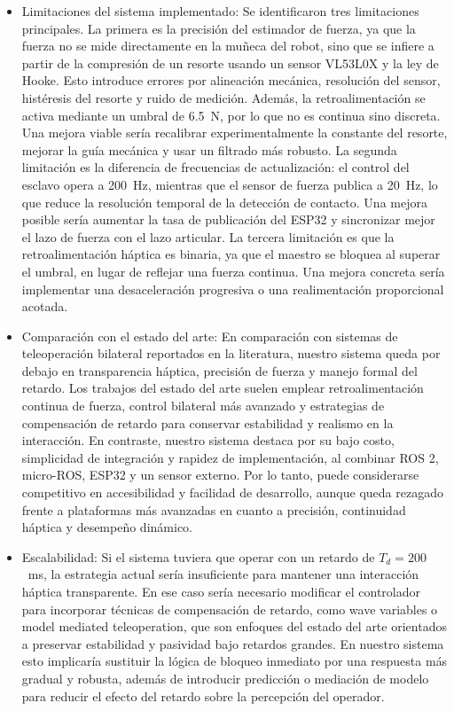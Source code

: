 \documentclass[journal,10pt,twoside]{IEEEtran}
\begin{document}
\begin{itemize}
    \item Limitaciones del sistema implementado: Se identificaron tres limitaciones principales. La primera es la precisión del estimador de fuerza, ya que la fuerza no se mide directamente en la muñeca del robot, sino que se infiere a partir de la compresión de un resorte usando un sensor VL53L0X y la ley de Hooke. Esto introduce errores por alineación mecánica, resolución del sensor, histéresis del resorte y ruido de medición. Además, la retroalimentación se activa mediante un umbral de 6.5~N, por lo que no es continua sino discreta. Una mejora viable sería recalibrar experimentalmente la constante del resorte, mejorar la guía mecánica y usar un filtrado más robusto. La segunda limitación es la diferencia de frecuencias de actualización: el control del esclavo opera a 200~Hz, mientras que el sensor de fuerza publica a 20~Hz, lo que reduce la resolución temporal de la detección de contacto. Una mejora posible sería aumentar la tasa de publicación del ESP32 y sincronizar mejor el lazo de fuerza con el lazo articular. La tercera limitación es que la retroalimentación háptica es binaria, ya que el maestro se bloquea al superar el umbral, en lugar de reflejar una fuerza continua. Una mejora concreta sería implementar una desaceleración progresiva o una realimentación proporcional acotada.
    \\

    \item Comparación con el estado del arte: En comparación con sistemas de teleoperación bilateral reportados en la literatura, nuestro sistema queda por debajo en transparencia háptica, precisión de fuerza y manejo formal del retardo. Los trabajos del estado del arte suelen emplear retroalimentación continua de fuerza, control bilateral más avanzado y estrategias de compensación de retardo para conservar estabilidad y realismo en la interacción. En contraste, nuestro sistema destaca por su bajo costo, simplicidad de integración y rapidez de implementación, al combinar ROS 2, micro-ROS, ESP32 y un sensor externo. Por lo tanto, puede considerarse competitivo en accesibilidad y facilidad de desarrollo, aunque queda rezagado frente a plataformas más avanzadas en cuanto a precisión, continuidad háptica y desempeño dinámico.
    \\
    
    \item Escalabilidad: Si el sistema tuviera que operar con un retardo de \(T_d = 200\)~ms, la estrategia actual sería insuficiente para mantener una interacción háptica transparente. En ese caso sería necesario modificar el controlador para incorporar técnicas de compensación de retardo, como wave variables o model mediated teleoperation, que son enfoques del estado del arte orientados a preservar estabilidad y pasividad bajo retardos grandes. En nuestro sistema esto implicaría sustituir la lógica de bloqueo inmediato por una respuesta más gradual y robusta, además de introducir predicción o mediación de modelo para reducir el efecto del retardo sobre la percepción del operador.
    \\


\end{itemize}
\end{document}
